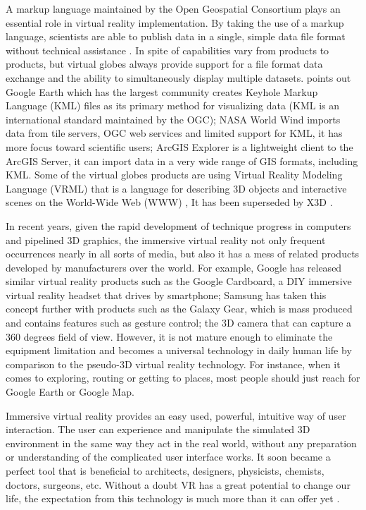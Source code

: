 A markup language maintained by the Open Geospatial Consortium \cite{ogc.2016} plays an essential role in virtual reality implementation. By taking the use of a markup language, scientists are able to publish data in a single, simple data file format without technical assistance \cite{blower.sharing-visualizing.2007}. In spite of capabilities vary from products to products, but virtual globes always provide support for a file format data exchange and the ability to simultaneously display multiple datasets. \cite{blower.sharing-visualizing.2007} points out Google Earth which has the largest community creates Keyhole Markup Language (KML) \cite{google.kml.2016} files as its primary method for visualizing data (KML is an international standard maintained by the OGC); NASA World Wind \cite{nasa.world-wind.2016} imports data from tile servers, OGC web services and limited support for KML, it has more focus toward scientific users; ArcGIS Explorer \cite{esri.arcgis-explorer.2016} is a lightweight client to the ArcGIS Server, it can import data in a very wide range of GIS formats, including KML. Some of the virtual globes products are using Virtual Reality Modeling Language (VRML) \cite{wiki.vrml.2016} that is a language for describing 3D objects and interactive scenes on the World-Wide Web (WWW) \cite{wiki.www.2016}, It has been superseded by X3D \cite{wiki.x3d.2016}.

In recent years, given the rapid development of technique progress in computers and pipelined 3D graphics, the immersive virtual reality not only frequent occurrences nearly in all sorts of media, but also it has a mess of related products developed by manufacturers over the world. For example, Google has released similar virtual reality products such as the Google Cardboard, a DIY immersive virtual reality headset that drives by smartphone; Samsung has taken this concept further with products such as the Galaxy Gear, which is mass produced and contains features such as gesture control; the 3D camera that can capture a 360 degrees field of view. However, it is not mature enough to eliminate the equipment limitation and becomes a universal technology in daily human life by comparison to the pseudo-3D virtual reality technology. For instance, when it comes to exploring, routing or getting to places, most people should just reach for Google Earth or Google Map.

Immersive virtual reality provides an easy used, powerful, intuitive way of user interaction. The user can experience and manipulate the simulated 3D environment in the same way they act in the real world, without any preparation or understanding of the complicated user interface works. It soon became a perfect tool that is beneficial to architects, designers, physicists, chemists, doctors, surgeons, etc. Without a doubt VR has a great potential to change our life, the expectation from this technology is much more than it can offer yet \cite{mazuryk.vr.1996}.

